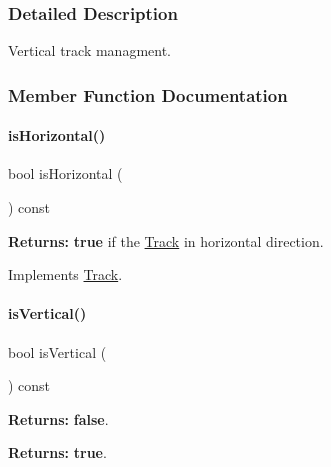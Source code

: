 \subsubsection{Detailed Description}
Vertical track managment. 

\subsubsection{Member Function Documentation}
\mbox{\label{classKite_1_1VerticalTrack_a21b9cefd33ae22e4c2070ad441bdd30b}} 
\paragraph{\texorpdfstring{is\+Horizontal()}{isHorizontal()}}
{\footnotesize\ttfamily bool is\+Horizontal (\begin{DoxyParamCaption}{ }\end{DoxyParamCaption}) const\hspace{0.3cm}{\ttfamily [virtual]}}

{\bfseries Returns\+:} {\bfseries true} if the \hyperlink{classKite_1_1Track}{Track} in horizontal direction. 

Implements \hyperlink{classKite_1_1Track_a9d3db1f8a5aca58f8f54d291faebf873}{Track}.

\mbox{\label{classKite_1_1VerticalTrack_abd54544ef1710ee4b67cfb021d73446c}} 
\paragraph{\texorpdfstring{is\+Vertical()}{isVertical()}}
{\footnotesize\ttfamily bool is\+Vertical (\begin{DoxyParamCaption}{ }\end{DoxyParamCaption}) const\hspace{0.3cm}{\ttfamily [virtual]}}

{\bfseries Returns\+:} {\bfseries false}.

{\bfseries Returns\+:} {\bfseries true}. 

